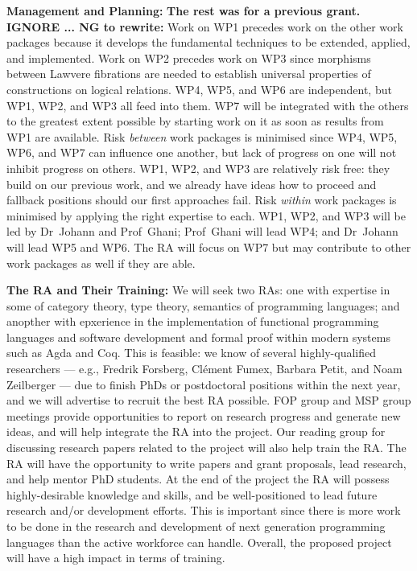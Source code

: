 \documentclass[a4paper,11pt]{article}
\begin{document}
{\bf Management and Planning:} {\bf The rest was for a previous
  grant. IGNORE ... NG to rewrite:} Work on WP1 precedes work on the other
work packages because it develops the fundamental techniques to be
extended, applied, and implemented. Work on WP2 precedes work on WP3
since morphisms between Lawvere fibrations are needed to establish
universal properties of constructions on logical relations. WP4, WP5,
and WP6 are independent, but WP1, WP2, and WP3 all feed into them. WP7
will be integrated with the others to the greatest extent possible by
starting work on it as soon as results from WP1 are available. Risk
{\em between} work packages is minimised since WP4, WP5, WP6, and WP7
can influence one another, but lack of progress on one will not
inhibit progress on others. WP1, WP2, and WP3
are relatively risk free: %
they build on our previous work, and we 
already have ideas how to proceed and fallback positions
should our first approaches fail. Risk {\em within} work packages
is minimised by 
applying 
the right expertise %
to %
each. %
WP1, WP2, and WP3 will be %
led by Dr~Johann and Prof~Ghani; Prof~Ghani will lead WP4; and
Dr~Johann will lead WP5 and WP6. The RA will focus on WP7
but %
may
contribute to other %
work packages as well if they are able.

\vspace*{0.02in}

{\bf The RA and Their Training:} We will seek two RAs: one with
expertise in some of category theory, type theory, semantics of
programming languages; and anopther with epxerience in the
implementation of functional programming languages and software
development and formal proof within modern systems such as Agda and
Coq. This is feasible: we know of several highly-qualified researchers
--- e.g., Fredrik Forsberg, Cl\'ement Fumex, Barbara Petit, and Noam
Zeilberger --- due to finish PhDs or postdoctoral positions within the
next year, and we will advertise to recruit the best RA
possible. %
FOP group and MSP group meetings
provide opportunities to report on research 
progress and generate new ideas, and will help integrate the RA into
the project. Our
reading group for discussing research
papers %
related to the project will also help train the RA. The RA will have
the opportunity to write papers and grant proposals, lead research,
and help mentor PhD students.  At the end of the project the RA will
possess highly-desirable knowledge and skills, and be well-positioned
to lead future research and/or development efforts. This is important
since there is more work to be done in the research and development of
next generation programming languages than the active workforce can
handle. Overall, the proposed project will have a high impact in terms
of training.
\end{document}
